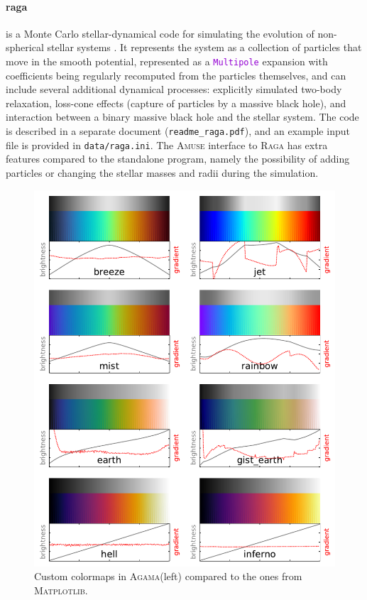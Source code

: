 \documentclass[12pt]{article}
\newcommand{\Agama}{\textsc{Agama}\xspace}
\newcommand{\Amuse}{\textsc{Amuse}\xspace}
\newcommand{\Raga} {\textsc{Raga}\xspace}
\newcommand{\ttt}[1]{\textcolor{darkviolet}{\texttt{#1}}}
\begin{document}
\paragraph{raga} is a Monte Carlo stellar-dynamical code for simulating the evolution of non-spherical stellar systems \cite{Vasiliev2015}. It represents the system as a collection of particles that move in the smooth potential, represented as a \ttt{Multipole} expansion with coefficients being regularly recomputed from the particles themselves, and can include several additional dynamical processes: explicitly simulated two-body relaxation, loss-cone effects (capture of particles by a massive black hole), and interaction between a binary massive black hole and the stellar system. The code is described in a separate document (\texttt{readme_raga.pdf}), and an example input file is provided in \texttt{data/raga.ini}. The \Amuse interface to \Raga has extra features compared to the standalone program, namely the possibility of adding particles or changing the stellar masses and radii during the simulation.

\begin{figure}
\begin{center}
\includegraphics{Colormaps.pdf}
\end{center}
\vspace*{-5mm}
\caption{Custom colormaps in \Agama (left) compared to the ones from \textsc{Matplotlib}.
}  \label{fig:colormaps}
\end{figure}
\end{document}
